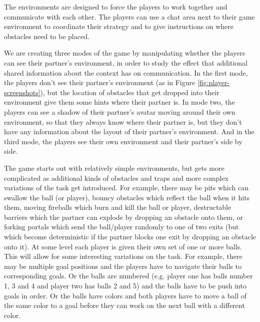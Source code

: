 The environments are designed to force the players to work together
and communicate with each other.  The players can use a chat area next
to their game environment to coordinate their strategy and to give
instructions on where obstacles need to be placed.



We are creating three modes of the game by manipulating whether the
players can see their partner's environment, in order to study the
effect that additional shared information about the context has on
communication.  In the first mode, the players don't see their
partner's environment (as in Figure \ref{fig:player-screenshots}), but
the location of obstacles that get dropped into their environment give
them some hints where their partner is. In mode two, the players can
see a shadow of their partner's avatar moving around their own
environment, so that they always know where their partner is, but they
don't have any information about the layout of their partner's
environment. And in the third mode, the players see their
own environment and their partner's side by side.



The game starts out with relatively simple environments, but gets more
complicated as additional kinds of obstacles and traps and more
complex variations of the task get introduced.  For example, there may
be pits which can swallow the ball (or player), bouncy obstacles which
reflect the ball when it hits them, moving fireballs which burn and
kill the ball or player, destructable barriers which the partner can
explode by dropping an obstacle onto them, or forking portals which
send the ball/player randomly to one of two exits (but which become
deterministic if the partner blocks one exit by dropping an obstacle
onto it).   At some level
each player is given their own set of one or more balls. This will
allow for some interesting variations on the task. For example, there
may be multiple goal positions and the players have to navigate their
balls to corresponding goals. Or the balls are numbered (e.g. player
one has balls number 1, 3 and 4 and player two has balls 2 and 5) and
the balls have to be push into goals in order. Or the balls have
colors and both players have to move a ball of the same color to a
goal before they can work on the next ball with a different color.
